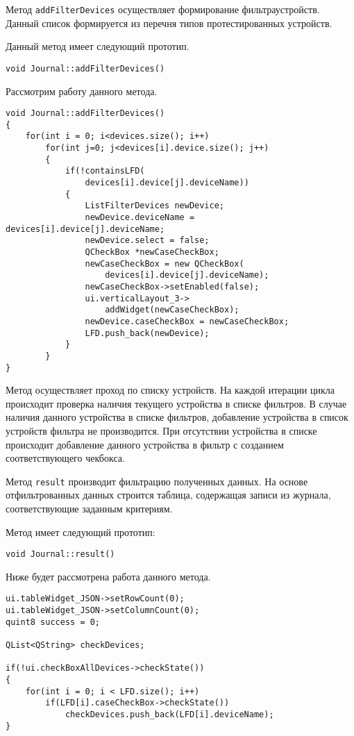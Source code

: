 Метод \texttt{addFilterDevices} осуществляет формирование фильтра\break устройств. Данный список формируется из перечня типов
протестированных устройств.

Данный метод
имеет следующий прототип.
\medskip
\begin{verbatim}
void Journal::addFilterDevices()
\end{verbatim}
\medskip

Рассмотрим работу данного метода.
\medskip
\begin{verbatim}
void Journal::addFilterDevices()
{
	for(int i = 0; i<devices.size(); i++)
		for(int j=0; j<devices[i].device.size(); j++)
		{
			if(!containsLFD(
				devices[i].device[j].deviceName))
			{
				ListFilterDevices newDevice;
				newDevice.deviceName = devices[i].device[j].deviceName;
				newDevice.select = false;
				QCheckBox *newCaseCheckBox;
				newCaseCheckBox = new QCheckBox(
					devices[i].device[j].deviceName);
				newCaseCheckBox->setEnabled(false);
				ui.verticalLayout_3->
					addWidget(newCaseCheckBox);
				newDevice.caseCheckBox = newCaseCheckBox;
				LFD.push_back(newDevice);
			}
		}
}
\end{verbatim}
\medskip

Метод осуществляет проход по списку устройств. На каждой итерации цикла происходит проверка наличия текущего устройства в
списке фильтров. В случае наличия данного устройства в списке фильтров, добавление устройства в список устройств
фильтра не производится. При отсутствии устройства в списке происходит добавление данного устройства в фильтр с
созданием соответствующего чекбокса.

Метод \texttt{result} производит фильтрацию полученных данных. На основе отфильтрованных данных строится таблица,
содержащая записи из журнала, соответствующие заданным критериям.

Метод имеет следующий прототип:
\medskip
\begin{verbatim}
void Journal::result()
\end{verbatim}
\medskip

Ниже будет рассмотрена работа данного метода.
\medskip
\begin{verbatim}
ui.tableWidget_JSON->setRowCount(0);
ui.tableWidget_JSON->setColumnCount(0);
quint8 success = 0;

QList<QString> checkDevices;

if(!ui.checkBoxAllDevices->checkState())
{
	for(int i = 0; i < LFD.size(); i++)
		if(LFD[i].caseCheckBox->checkState())
			checkDevices.push_back(LFD[i].deviceName);
}
\end{verbatim}
\medskip

